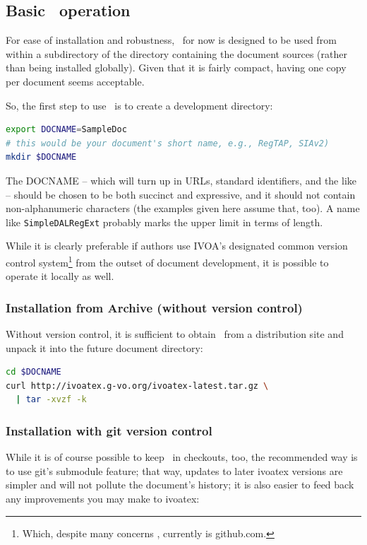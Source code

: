 \documentclass[11pt,a4paper]{ivoa}
\begin{document}
\subsection{Basic \ivoatex~operation}

For ease of installation and robustness, \ivoatex\ for now is designed
to be used from within a subdirectory of the directory containing the
document sources (rather than being installed globally).  Given that
it is fairly compact, having one copy per document seems acceptable.

So, the first step to use \ivoatex\ is to create a development
directory:

\begin{lstlisting}[language=sh]
export DOCNAME=SampleDoc
# this would be your document's short name, e.g., RegTAP, SIAv2)
mkdir $DOCNAME
\end{lstlisting}

The DOCNAME -- which will turn up in URLs, standard identifiers, and the
like -- should be chosen to be both succinct and expressive, and it
should not contain non-alphanumeric characters (the examples given here
assume that, too).  A name
like \texttt{SimpleDALRegExt} probably marks the upper limit in terms of
length.

While it is clearly preferable if authors use IVOA's 
designated common version control system\footnote{Which, despite
many concerns \citep{book:zuboff}, currently is
github.com.} from the outset of
document development, it is possible to operate it locally as well.

\subsubsection{Installation from Archive (without version control)}

Without version control, it is sufficient to obtain \ivoatex\ from a
distribution site and unpack it into the future document directory:

\begin{lstlisting}[language=sh]
cd $DOCNAME
curl http://ivoatex.g-vo.org/ivoatex-latest.tar.gz \
  | tar -xvzf -k
\end{lstlisting}

\subsubsection{Installation with git version control}

While it is of course possible to keep \ivoatex\ in checkouts, too,
the recommended way is to use git's submodule feature; that way, updates
to later ivoatex versions are simpler and will not pollute the
document's history; it is also easier to feed back any improvements
you may make to ivoatex:
\end{document}
